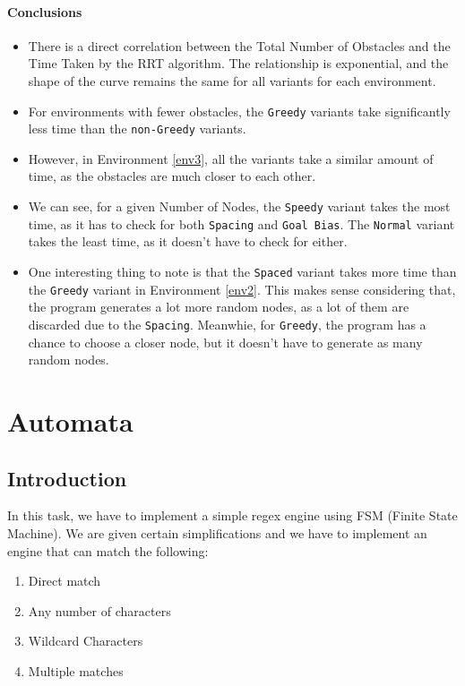 \documentclass[12pt]{report}
\begin{document}
\subsubsection{Conclusions}
\begin{itemize}
    \item There is a direct correlation between the Total Number of Obstacles and the Time Taken by the RRT algorithm. The relationship is exponential, and the shape of the curve remains the same for all variants for each environment.
    \item For environments with fewer obstacles, the \texttt{Greedy} variants take significantly less time than the \texttt{non-Greedy} variants.
    \item However, in Environment \ref{env3}, all the variants take a similar amount of time, as the obstacles are much closer to each other.
    \item We can see, for a given Number of Nodes, the \texttt{Speedy} variant takes the most time, as it has to check for both \texttt{Spacing} and \texttt{Goal Bias}. The \texttt{Normal} variant takes the least time, as it doesn't have to check for either.
    \item One interesting thing to note is that the \texttt{Spaced} variant takes more time than the \texttt{Greedy} variant in Environment \ref{env2}. This makes sense considering that, the program generates a lot more random nodes, as a lot of them are discarded due to the \texttt{Spacing}. Meanwhie, for \texttt{Greedy}, the program has a chance to choose a closer node, but it doesn't have to generate as many random nodes.
\end{itemize}
\chapter{Automata}

\section{Introduction}

In this task, we have to implement a simple regex engine using FSM (Finite State Machine). We are given certain simplifications and we have to implement an engine that can match the following:
\begin{enumerate}
    \item Direct match
    \item Any number of characters
    \item Wildcard Characters
    \item Multiple matches
\end{enumerate}
\end{document}
